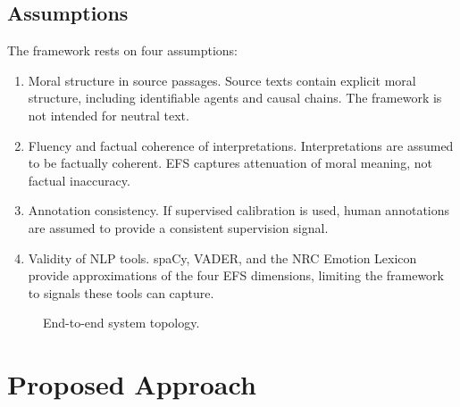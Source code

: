 \documentclass[10pt, conference]{IEEEtran}
\begin{document}
\subsection{Assumptions}

The framework rests on four assumptions:

\begin{enumerate}
    \item Moral structure in source passages. Source texts contain explicit moral structure, including identifiable agents and causal chains. The framework is not intended for neutral text.

    \item Fluency and factual coherence of interpretations. Interpretations are assumed to be factually coherent. EFS captures attenuation of moral meaning, not factual inaccuracy.

    \item Annotation consistency. If supervised calibration is used, human annotations are assumed to provide a consistent supervision signal.

    \item Validity of NLP tools. spaCy, VADER, and the NRC Emotion Lexicon provide approximations of the four EFS dimensions, limiting the framework to signals these tools can capture.
\end{enumerate}

\begin{figure}
    \centering
    \caption{End-to-end system topology.}
    \label{fig:systemModel}
\end{figure}

\section{Proposed Approach} \label{Approach}
\end{document}
